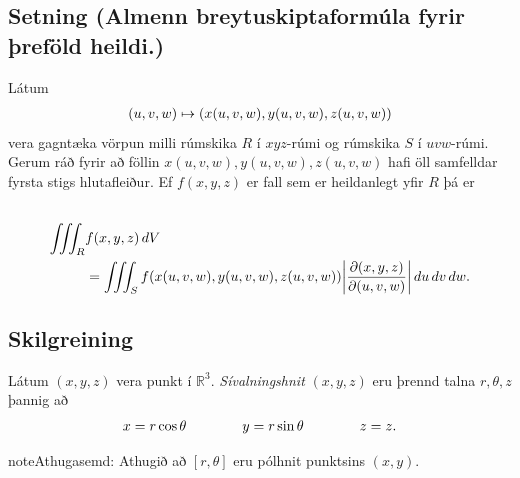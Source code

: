 \documentclass[a4paper,10pt,icelandic]{sphinxmanual}
\begin{document}
\subsection{Setning (Almenn breytuskiptaformúla fyrir þreföld heildi.)}
\label{Kafli4:setning-almenn-breytuskiptaformula-fyrir-refold-heildi}
Látum
\begin{gather}
\begin{split}\displaystyle (u,v,w)\mapsto (x(u,v,w), y(u,v,w), z(u,v,w))\end{split}\notag
\end{gather}
vera gagntæka vörpun milli rúmskika \(R\) í \(xyz\)-rúmi og
rúmskika \(S\) í \(uvw\)-rúmi. Gerum ráð fyrir að föllin
\(x(u,v,w), y(u,v,w), z(u,v,w)\) hafi öll samfelldar fyrsta stigs
hlutafleiður. Ef \(f(x,y,z)\) er fall sem er heildanlegt yfir
\(R\) þá er
\begin{gather}
\begin{split}\displaystyle\end{split}\notag\\\begin{split}\begin{aligned}
\int\!\!\!\int\!\!\!\int_R& f(x,y,z)\,dV \\&=\int\!\!\!\int\!\!\!\int_S f(x(u,v,w), y(u,v,w), z(u,v,w))
\bigg|\frac{\partial(x,y,z)}{\partial(u,v,w)}\bigg|\,du\,dv\,dw.\end{aligned}\end{split}\notag
\end{gather}

\subsection{Skilgreining}
\label{Kafli4:index-12}\label{Kafli4:id18}
Látum \((x,y,z)\) vera punkt í \({\mathbb  R}^3\).
\textit{Sívalningshnit} \((x,y,z)\) eru þrennd talna \(r, \theta, z\)
þannig að
\begin{gather}
\begin{split}\displaystyle x=r\cos\theta\qquad\qquad y=r\sin\theta\qquad\qquad z=z.\end{split}\notag
\end{gather}
\begin{notice}{note}{Athugasemd:}
Athugið að \([r,\theta]\) eru pólhnit punktsins \((x,y)\).
\end{notice}

\end{document}
